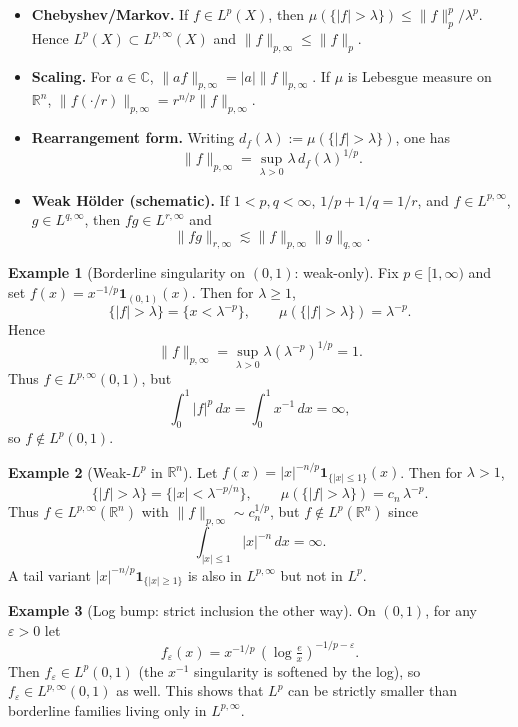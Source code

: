 \documentclass[12pt,a4paper]{article}
\theoremstyle{plain}
\theoremstyle{definition}
\theoremstyle{remark}
\theoremstyle{remark}
\theoremstyle{definition}
\newtheorem*{example*}{Example}
\begin{document}
	\begin{itemize}\itemsep8pt
		\item \textbf{Chebyshev/Markov.} If $f\in L^p(X)$, then
		$\mu(\{|f|>\lambda\})\le \|f\|_p^p/\lambda^p$.
		Hence $L^p(X)\subset L^{p,\infty}(X)$ and $\|f\|_{p,\infty}\le \|f\|_{p}$.
		
		\item \textbf{Scaling.} For $a\in\mathbb{C}$, $\|af\|_{p,\infty}=|a|\|f\|_{p,\infty}$.
		If $\mu$ is Lebesgue measure on $\mathbb{R}^n$,
		$\|f(\cdot /r)\|_{p,\infty}=r^{n/p}\|f\|_{p,\infty}$.
		
		\item \textbf{Rearrangement form.} Writing $d_f(\lambda):=\mu(\{|f|>\lambda\})$,
		one has
		\[
		\|f\|_{p,\infty}=\sup_{\lambda>0}\lambda\, d_f(\lambda)^{1/p}.
		\]
		
		\item \textbf{Weak Hölder (schematic).} If $1<p,q<\infty$,
		$1/p+1/q=1/r$, and $f\in L^{p,\infty}$, $g\in L^{q,\infty}$,
		then $fg\in L^{r,\infty}$ and
		\[
		\|fg\|_{r,\infty}\lesssim \|f\|_{p,\infty}\|g\|_{q,\infty}.
		\]
	\end{itemize}


\bigskip

\begin{example*}[Borderline singularity on $(0,1)$: weak-only]
	Fix $p\in[1,\infty)$ and set $f(x)=x^{-1/p}\mathbf{1}_{(0,1)}(x)$.
	Then for $\lambda\ge 1$,
	\[
	\{|f|>\lambda\}=\{x<\lambda^{-p}\},\qquad
	\mu(\{|f|>\lambda\})=\lambda^{-p}.
	\]
	Hence
	\[
	\|f\|_{p,\infty}
	=\sup_{\lambda>0}\lambda(\lambda^{-p})^{1/p}=1.
	\]
	Thus $f\in L^{p,\infty}(0,1)$, but
	\[
	\int_0^1 |f|^p\,dx
	= \int_0^1 x^{-1}\,dx = \infty,
	\]
	so $f\notin L^p(0,1)$.
\end{example*}

\bigskip

\begin{example*}[Weak-$L^p$ in $\mathbb{R}^n$]
	Let $f(x)=|x|^{-n/p}\mathbf{1}_{\{|x|\le 1\}}(x)$.
	Then for $\lambda>1$,
	\[
	\{|f|>\lambda\}=\{|x|<\lambda^{-p/n}\},\qquad
	\mu(\{|f|>\lambda\})=c_n\,\lambda^{-p}.
	\]
	Thus $f\in L^{p,\infty}(\mathbb{R}^n)$ with $\|f\|_{p,\infty}\sim c_n^{1/p}$,
	but $f\notin L^p(\mathbb{R}^n)$ since
	\[
	\int_{|x|\le1}|x|^{-n}\,dx=\infty.
	\]
	A tail variant $|x|^{-n/p}\mathbf{1}_{\{|x|\ge1\}}$
	is also in $L^{p,\infty}$ but not in $L^p$.
\end{example*}

\bigskip

\begin{example*}[Log bump: strict inclusion the other way]
	On $(0,1)$, for any $\varepsilon>0$ let
	\[
	f_\varepsilon(x)=x^{-1/p}\,(\log\tfrac{e}{x})^{-1/p-\varepsilon}.
	\]
	Then $f_\varepsilon\in L^p(0,1)$
	(the $x^{-1}$ singularity is softened by the log),
	so $f_\varepsilon\in L^{p,\infty}(0,1)$ as well.
	This shows that $L^p$ can be strictly smaller
	than borderline families living only in $L^{p,\infty}$.
\end{example*}
\end{document}
